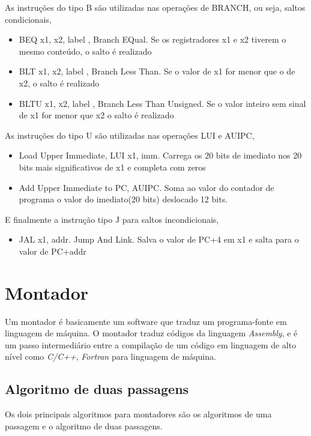 		As instruções do tipo B são utilizadas nas operações de BRANCH, ou seja, saltos condicionais,
		\begin{itemize}
			\item{BEQ x1, x2, label , Branch EQual. Se os registradores x1 e x2 tiverem o mesmo conteúdo, o salto é realizado}
			\item{BLT x1, x2, label , Branch Less Than. Se o valor de x1 for menor que o de x2, o salto é realizado}
			\item{BLTU x1, x2, label , Branch Less Than Unsigned. Se o valor inteiro sem sinal de x1 for menor que x2 o salto é realizado }
		\end{itemize}

		As instruções do tipo U são utilizadas nas operações LUI e AUIPC,
		\begin{itemize}
			\item{Load Upper Immediate, LUI x1, imm. Carrega os 20 bits de imediato nos 20 bits mais significativos de x1 e completa com zeros}
			\item{Add Upper Immediate to PC, AUIPC. Soma ao valor do contador de programa o valor do imediato(20 bits) deslocado 12 bits.}
		\end{itemize}

		E finalmente a instrução tipo J para saltos incondicionais, 
		\begin{itemize}
			\item{JAL x1, addr. Jump And Link. Salva o valor de PC+4 em x1 e salta para o valor de PC+addr}
		\end{itemize}


\section{Montador}

	Um montador é basicamente um software que traduz um programa-fonte em linguagem de máquina. O montador traduz códigos da linguagem \textit{Assembly}, e é um passo intermediário entre a compilação de um código em linguagem de alto nível como \textit{C/C++}, \textit{Fortran} para linguagem de máquina.

	\subsection{Algoritmo de duas passagens}

		Os dois principais algoritmos para montadores são os algoritmos de uma passagem e o algoritmo de duas passagens.

